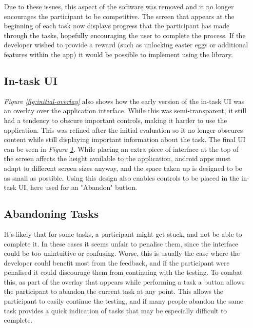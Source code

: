Due to these issues, this aspect of the software was removed and it no longer encourages
the participant to be competitive. The screen that appears at the beginning of each task now displays
progress that the participant has made through the tasks, hopefully encouraging
the user to complete the process. If the developer wished to provide a reward (such as
unlocking easter eggs or additional features within the app) it would be possible to implement using
the library.

\subsection{In-task UI}

\emph{Figure \ref{fig:initial-overlay}} also shows how the early version of the in-task UI was an overlay over the application interface. While this was semi-transparent, it still had a tendency to obscure important controls, making it harder to use the application. This was refined after the initial evaluation so it no longer obscures content while still displaying important information about the task. The final UI can be seen in \emph{Figure \ref{fig:final-task-overlay}}. While placing an extra piece of interface at the top of the screen affects the height available to the application, android apps must adapt to different screen sizes anyway, and the space taken up is designed to be as small as possible. Using this design also enables controls to be placed in the in-task UI, here used for an "Abandon" button.

\begin{figure}
  \label{fig:final-task-overlay}
\end{figure}

\subsection{Abandoning Tasks}

It's likely that for some tasks, a participant might get stuck, and not be able
to complete it. In these cases it seems unfair to penalise them, since the
interface could be too unintuitive or confusing. Worse, this is usually the case
where the developer could benefit most from the feedback, and if the participant
were penalised it could discourage them from continuing with the testing. To
combat this, as part of the overlay that appears while performing a task a
button allows the participant to abandon the current task at any point. This allows the participant to easily continue the testing, and if many people abandon the same task provides a quick indication of tasks that may be especially difficult to complete.

